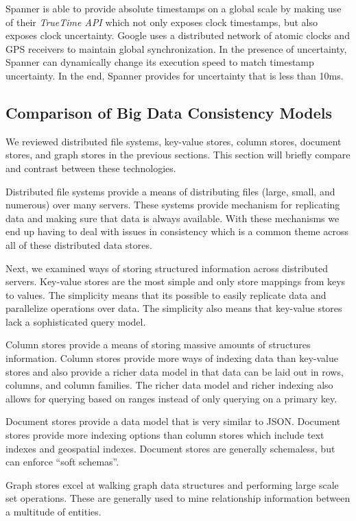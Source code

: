 \documentclass[]{article}
\begin{document}
Spanner is able to provide absolute timestamps on a global scale by making use of their \textit{TrueTime API} which not only exposes clock timestamps, but also exposes clock uncertainty. Google uses a distributed network of atomic clocks and GPS receivers to maintain global synchronization. In the presence of uncertainty, Spanner can dynamically change its execution speed to match timestamp uncertainty. In the end, Spanner provides for uncertainty that is less than 10ms.

\subsection{Comparison of Big Data Consistency Models}
We reviewed distributed file systems, key-value stores, column stores, document stores, and graph stores in the previous sections. This section will briefly compare and contrast between these technologies.

Distributed file systems provide a means of distributing files (large, small, and numerous) over many servers. These systems provide mechanism for replicating data and making sure that data is always available. With these mechanisms we end up having to deal with issues in consistency which is a common theme across all of these distributed data stores.

Next, we examined ways of storing structured information across distributed servers. Key-value stores are the most simple and only store mappings from keys to values. The simplicity means that its possible to easily replicate data and parallelize operations over data. The simplicity also means that key-value stores lack a sophisticated query model. 

Column stores provide a means of storing massive amounts of structures information. Column stores provide more ways of indexing data than key-value stores and also provide a richer data model in that data can be laid out in rows, columns, and column families. The richer data model and richer indexing also allows for querying based on ranges instead of only querying on a primary key.

Document stores provide a data model that is very similar to JSON. Document stores provide more indexing options than column stores which include text indexes and geospatial indexes. Document stores are generally schemaless, but can enforce ``soft schemas''.

Graph stores excel at walking graph data structures and performing large scale set operations. These are generally used to mine relationship information between a multitude of entities.
\end{document}
